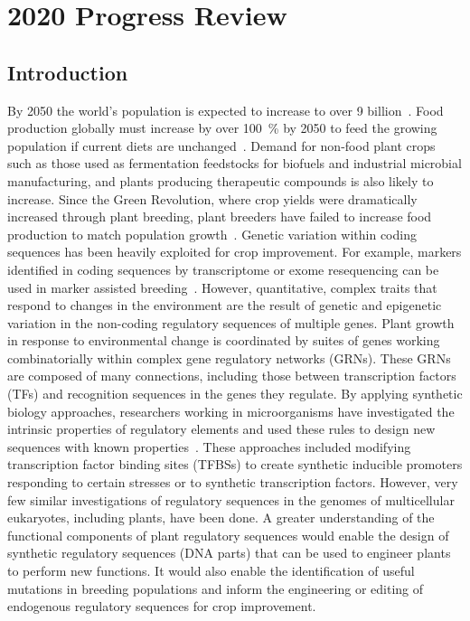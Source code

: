 \chapter{2020 Progress Review}
\label{ch:progressreview2020}

\section{Introduction}\label{introduction}
By 2050 the world’s population is expected to increase to over 9 billion~\autocite{gerlandWorldPopulationStabilization2014}. Food production globally must increase by over \SI{100}{\percent} by 2050 to feed the growing population if current diets are unchanged~\autocite{tilmanGlobalFoodDemand2011,berners-leeCurrentGlobalFood2018}. Demand for non\hyp{}food plant crops such as those used as fermentation feedstocks for biofuels and industrial microbial manufacturing, and plants producing therapeutic compounds is also likely to increase. Since the Green Revolution, where crop yields were dramatically increased through plant breeding, plant breeders have failed to increase food production to match population growth~\autocite{kropffQuantitativeUnderstandingYield1994,zhuImprovingPhotosyntheticEfficiency2010}. Genetic variation within coding sequences has been heavily exploited for crop improvement. For example, markers identified in coding sequences by transcriptome or exome resequencing can be used in marker assisted breeding~\autocite{varshneyGeneBasedMarkerSystems2009}. However, quantitative, complex traits that respond to changes in the environment are the result of genetic and epigenetic variation in the non\hyp{}coding regulatory sequences of multiple genes. Plant growth in response to environmental change is coordinated by suites of genes working combinatorially within complex gene regulatory networks (GRNs). These GRNs are composed of many connections, including those between transcription factors (TFs) and recognition sequences in the genes they regulate. By applying synthetic biology approaches, researchers working in microorganisms have investigated the intrinsic properties of regulatory elements and used these rules to design new sequences with known properties~\autocite{curranDesignSyntheticYeast2014,zessConstructionNewSynthetic2016,rajkumarEngineeringSyntheticStressresponsive2016,machensSyntheticPromotersTranscription2017,cuperusDeepLearningRegulatory2017}. These approaches included modifying transcription factor binding sites (TFBSs) to create synthetic inducible promoters responding to certain stresses or to synthetic transcription factors. However, very few similar investigations of regulatory sequences in the genomes of multicellular eukaryotes, including plants, have been done. A greater understanding of the functional components of plant regulatory sequences would enable the design of synthetic regulatory sequences (DNA parts) that can be used to engineer plants to perform new functions. It would also enable the identification of useful mutations in breeding populations and inform the engineering or editing of endogenous regulatory sequences for crop improvement.


